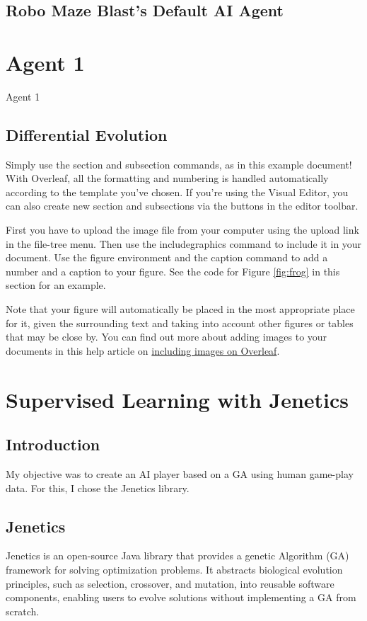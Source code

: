 \documentclass[sigconf]{acmart} %
\begin{document}
\subsection{Robo Maze Blast's Default AI Agent}


\section{Agent 1}
Agent 1 

\subsection{Differential Evolution}

Simply use the section and subsection commands, as in this example document! With Overleaf, all the formatting and numbering is handled automatically according to the template you've chosen. If you're using the Visual Editor, you can also create new section and subsections via the buttons in the editor toolbar.

First you have to upload the image file from your computer using the upload link in the file-tree menu. Then use the includegraphics command to include it in your document. Use the figure environment and the caption command to add a number and a caption to your figure. See the code for Figure \ref{fig:frog} in this section for an example.

    Note that your figure will automatically be placed in the most appropriate place for it, given the surrounding text and taking into account other figures or tables that may be close by. You can find out more about adding images to your documents in this help article on \href{https://www.overleaf.com/learn/how-to/Including_images_on_Overleaf}{including images on Overleaf}.

\section{Supervised Learning with Jenetics}
\subsection{Introduction}
My objective was to create an AI player based on a GA using human game-play data. For this, I chose the Jenetics library. 

\subsection{Jenetics}
Jenetics is an open-source Java library that provides a genetic Algorithm (GA) framework for solving optimization problems. It abstracts biological evolution principles, such as selection, crossover, and mutation, into reusable software components, enabling users to evolve solutions without implementing a GA from scratch. 
\end{document}
